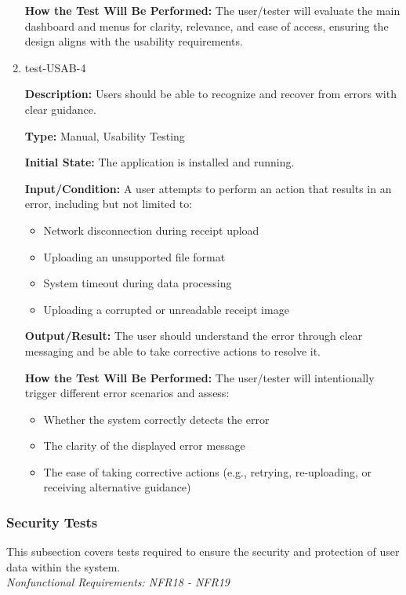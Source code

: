 \documentclass[12pt, titlepage]{article}
\begin{document}
\begin{enumerate}
\textbf{How the Test Will Be Performed:} The user/tester will evaluate the main
dashboard and menus for clarity, relevance, and ease of access, ensuring the
design aligns with the usability requirements.

\item{test-USAB-4\\}

\textbf{Description:} Users should be able to recognize and recover from errors with clear guidance.

\textbf{Type:} Manual, Usability Testing
					
\textbf{Initial State:} The application is installed and running.
					
\textbf{Input/Condition:} A user attempts to perform an action that results in an error, including but not limited to:
\begin{itemize}
    \item Network disconnection during receipt upload
    \item Uploading an unsupported file format
    \item System timeout during data processing
    \item Uploading a corrupted or unreadable receipt image
\end{itemize}

\textbf{Output/Result:} The user should understand the error through clear messaging and be able to take corrective actions to resolve it.

\textbf{How the Test Will Be Performed:} The user/tester will intentionally trigger different error scenarios and assess:
\begin{itemize}
    \item Whether the system correctly detects the error
    \item The clarity of the displayed error message
    \item The ease of taking corrective actions (e.g., retrying, re-uploading, or receiving alternative guidance)
\end{itemize}

\end{enumerate}

\subsubsection{Security Tests}

This subsection covers tests required to ensure the security and protection of user data within the system. \\
\textit{Nonfunctional Requirements: NFR18 - NFR19}
\end{document}
